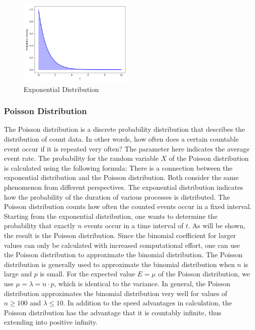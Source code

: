 \begin{figure}[h]
    \centering
    \includegraphics[width=0.5\textwidth]{../images/plot_exponential_distribution.png}
    \caption{Exponential Distribution}
    \label{fig:exponential_distribution}
\end{figure}

\subsubsection{Poisson Distribution}\label{Poisson Distribution}
The Poisson distribution is a discrete probability distribution that describes the distribution of count data. In other words, how often does a certain countable event occur if it is repeated very often? The parameter here indicates the average event rate. The probability for the random variable $X$ of the Poisson distribution is calculated using the following formula:
There is a connection between the exponential distribution and the Poisson distribution. Both consider the same phenomenon from different perspectives. The exponential distribution indicates how the probability of the duration of various processes is distributed. The Poisson distribution counts how often the counted events occur in a fixed interval. Starting from the exponential distribution, one wants to determine the probability that exactly $n$ events occur in a time interval of $t$. As will be shown, the result is the Poisson distribution. Since the binomial coefficient for larger values can only be calculated with increased computational effort, one can use the Poisson distribution to approximate the binomial distribution. The Poisson distribution is generally used to approximate the binomial distribution when $n$ is large and $p$ is small. For the expected value $E=\mu$ of the Poisson distribution, we use $\mu=\lambda=n \cdot p$, which is identical to the variance. In general, the Poisson distribution approximates the binomial distribution very well for values of $n \geq 100$ and $\lambda \leq 10$. In addition to the speed advantages in calculation, the Poisson distribution has the advantage that it is countably infinite, thus extending into positive infinity.

